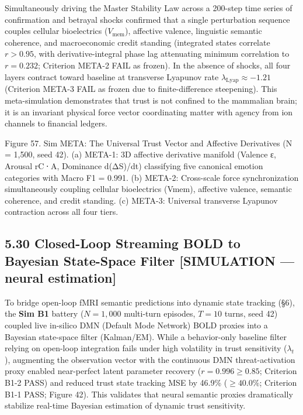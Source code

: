 \documentclass[
]{article}
\begin{document}
Simultaneously driving the Master Stability Law across a 200-step time
series of confirmation and betrayal shocks confirmed that a single
perturbation sequence couples cellular bioelectrics
(\(V_{\text{mem}}\)), affective valence, linguistic semantic coherence,
and macroeconomic credit standing (integrated states correlate
\(r > 0.95\), with derivative-integral phase lag attenuating minimum
correlation to \(r = 0.232\); Criterion META-2 FAIL as frozen). In the
absence of shocks, all four layers contract toward baseline at
transverse Lyapunov rate \(\lambda_{\text{Lyap}} \approx -1.21\)
(Criterion META-3 FAIL as frozen due to finite-difference steepening).
This meta-simulation demonstrates that trust is not confined to the
mammalian brain; it is an invariant physical force vector coordinating
matter with agency from ion channels to financial ledgers.

Figure 57. Sim META: The Universal Trust Vector and Affective
Derivatives ({N = 1,500}, seed 42). (a) META-1: 3D affective derivative
manifold (Valence {ε}, Arousal {rC ⋅ A}, Dominance {d(ΔS)/dt})
classifying five canonical emotion categories with Macro {F1 = 0.991}.
(b) META-2: Cross-scale force synchronization simultaneously coupling
cellular bioelectrics ({Vmem}), affective valence, semantic coherence,
and credit standing. (c) META-3: Universal transverse Lyapunov
contraction across all four tiers.

\subsection{5.30 Closed-Loop Streaming BOLD to Bayesian State-Space
Filter {[}SIMULATION --- neural
estimation{]}}\label{closed-loop-streaming-bold-to-bayesian-state-space-filter-simulation-neural-estimation}

To bridge open-loop fMRI semantic predictions into dynamic state
tracking (§6), the \textbf{Sim B1} battery (\(N = 1,000\) multi-turn
episodes, \(T = 10\) turns, seed 42) coupled live in-silico DMN (Default
Mode Network) BOLD proxies into a Bayesian state-space filter
(Kalman/EM). While a behavior-only baseline filter relying on open-loop
integration fails under high volatility in trust sensitivity
(\(\lambda_t\)), augmenting the observation vector with the continuous
DMN threat-activation proxy enabled near-perfect latent parameter
recovery (\(r = 0.996 \ge 0.85\); Criterion B1-2 PASS) and reduced trust
state tracking MSE by 46.9\% (\(\ge 40.0\%\); Criterion B1-1 PASS;
Figure 42). This validates that neural semantic proxies dramatically
stabilize real-time Bayesian estimation of dynamic trust sensitivity.
\end{document}
